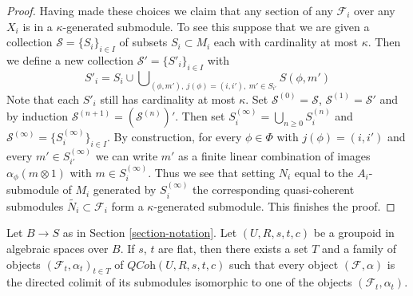 \begin{proof}
\medskip\noindent
Having made these choices we claim that any section of any $\mathcal{F}_i$
over any $X_i$ is in a $\kappa$-generated submodule. To see this suppose
that we are given a collection $\mathcal{S} = \{S_i\}_{i \in I}$ of subsets
$S_i \subset M_i$ each with cardinality at most $\kappa$. Then we define
a new collection $\mathcal{S}' = \{S'_i\}_{i \in I}$ with
$$
S'_i = S_i \cup
\bigcup\nolimits_{(\phi, m'),\ j(\phi) = (i, i'),\ m' \in S_{i'}} S(\phi, m')
$$
Note that each $S'_i$ still has cardinality at most $\kappa$.
Set $\mathcal{S}^{(0)} = \mathcal{S}$,
$\mathcal{S}^{(1)} = \mathcal{S}'$ and by induction
$\mathcal{S}^{(n + 1)} = (\mathcal{S}^{(n)})'$. Then set
$S_i^{(\infty)} = \bigcup_{n \geq 0} S_i^{(n)}$ and
$\mathcal{S}^{(\infty)} = \{S_i^{(\infty)}\}_{i \in I}$.
By construction, for every $\phi \in \Phi$ with $j(\phi) = (i, i')$
and every $m' \in S^{(\infty)}_{i'}$ we can write $m'$
as a finite linear combination of images $\alpha_\phi(m \otimes 1)$
with $m \in S_i^{(\infty)}$. Thus we see that setting $N_i$ equal
to the $A_i$-submodule of $M_i$ generated by $S_i^{(\infty)}$
the corresponding quasi-coherent submodules
$\widetilde{N_i} \subset \mathcal{F}_i$ form a $\kappa$-generated submodule.
This finishes the proof.
\end{proof}

\begin{lemma}
\label{lemma-set-generators}
Let $B \to S$ as in Section \ref{section-notation}.
Let $(U, R, s, t, c)$ be a groupoid in algebraic spaces over $B$.
If $s$, $t$ are flat, then there exists a set $T$ and a family of objects
$(\mathcal{F}_t, \alpha_t)_{t \in T}$ of $\textit{QCoh}(U, R, s, t, c)$
such that every object $(\mathcal{F}, \alpha)$ is the directed colimit
of its submodules isomorphic to one of the objects $(\mathcal{F}_t, \alpha_t)$.
\end{lemma}

